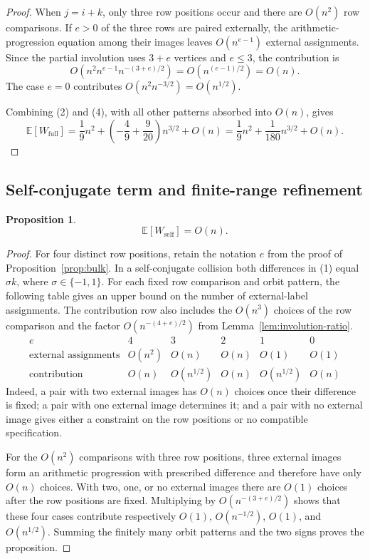 \documentclass[11pt]{article}
\newtheorem{proposition}{Proposition}
\begin{document}
\begin{proof}
When $j=i+k$, only three row positions occur and there are $O(n^2)$ row
comparisons.  If $e>0$ of the three rows are paired externally, the
arithmetic-progression equation among their images leaves
$O(n^{e-1})$ external assignments.  Since the partial involution uses
$3+e$ vertices and $e\leq3$, the contribution is
\[
O\!\left(n^2n^{e-1}n^{-(3+e)/2}\right)=O(n^{(e-1)/2})=O(n).
\]
The case $e=0$ contributes
$O(n^2n^{-3/2})=O(n^{1/2})$.

Combining (2) and (4), with all other patterns absorbed into $O(n)$,
gives
\[
\mathbb{E}[W_{\mathrm{full}}]
=\frac19n^2+
\left(-\frac49+\frac9{20}\right)n^{3/2}+O(n)
=\frac19n^2+\frac1{180}n^{3/2}+O(n).
\]
\end{proof}

\subsection{Self-conjugate term and finite-range refinement}

\begin{proposition}
\label{prop:self-bound}
\[
\mathbb{E}[W_{\mathrm{self}}]=O(n).
\]
\end{proposition}

\begin{proof}
For four distinct row positions, retain the notation $e$ from the proof
of Proposition~\ref{prop:bulk}.  In a self-conjugate collision both
differences in (1) equal $\sigma k$, where $\sigma\in\{-1,1\}$.  For each
fixed row comparison and orbit pattern, the following table gives an
upper bound on the number of external-label assignments.  The contribution
row also includes the $O(n^3)$ choices of the row comparison and the factor
$O(n^{-(4+e)/2})$ from
Lemma~\ref{lem:involution-ratio}.
\[
\begin{array}{c|ccccc}
e&4&3&2&1&0\\ \hline
\text{external assignments}&O(n^2)&O(n)&O(n)&O(1)&O(1)\\
\text{contribution}&O(n)&O(n^{1/2})&O(n)&O(n^{1/2})&O(n)
\end{array}
\]
Indeed, a pair with two external images has $O(n)$ choices once their
difference is fixed; a pair with one external image determines it; and
a pair with no external image gives either a constraint on the row
positions or no compatible specification.

For the $O(n^2)$ comparisons with three row positions, three external
images form an arithmetic progression with prescribed difference and
therefore have only $O(n)$ choices.  With two, one, or no external images
there are $O(1)$ choices after the row positions are fixed.  Multiplying
by $O(n^{-(3+e)/2})$ shows that these four cases contribute respectively
$O(1)$, $O(n^{-1/2})$, $O(1)$, and $O(n^{1/2})$.  Summing the finitely
many orbit patterns and the two signs proves the proposition.
\end{proof}
\end{document}
